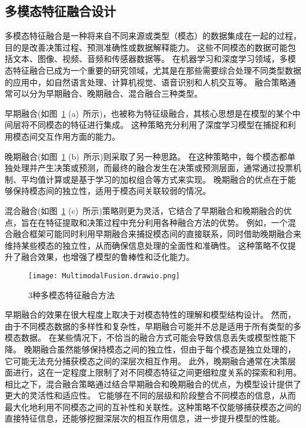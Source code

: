 \subsection{多模态特征融合设计}
多模态特征融合是一种将来自不同来源或类型（模态）的数据集成在一起的过程，目的是改善决策过程、预测准确性或数据解释能力。
这些不同模态的数据可能包括文本、图像、视频、音频和传感器数据等。
在机器学习和深度学习领域，多模态特征融合已成为一个重要的研究领域，尤其是在那些需要综合处理不同类型数据的应用中，如自然语言处理、计算机视觉、语音识别和人机交互等。
融合策略通常可以分为早期融合、晚期融合、混合融合三种类型\cite{hejunandzhangcaiqing}。\par

早期融合(如图~\ref{fig:MultimodalFusio} (a)~所示)，也被称为特征级融合，其核心思想是在模型的某个中间层将不同模态的特征进行集成。
这种策略充分利用了深度学习模型在捕捉和利用模态间交互作用方面的能力。\par

晚期融合(如图~\ref{fig:MultimodalFusio} (b)~所示)则采取了另一种思路。
在这种策略中，每个模态都单独处理并产生决策或预测，而最终的融合发生在决策或预测层面，通常通过投票机制、平均值计算或是基于学习的加权组合等方式来实现。
晚期融合的优点在于能够保持模态间的独立性，适用于模态间关联较弱的情况。\par

混合融合(如图~\ref{fig:MultimodalFusio} (c)~所示)策略则更为灵活，它结合了早期融合和晚期融合的优点，旨在在特征提取和决策过程中充分利用各种融合方法的优势。
例如，一个混合融合框架可能同时利用早期融合来捕捉模态间的直接联系，同时借助晚期融合来维持某些模态的独立性，从而确保信息处理的全面性和准确性。
这种策略不仅提升了融合效果，也增强了模型的鲁棒性和泛化能力。\par

\begin{figure}[h]
	\centering
	\texttt{[image: MultimodalFusion.drawio.png]}
	\caption{3种多模态特征融合方法}
	\label{fig:MultimodalFusio}
\end{figure}


早期融合的效果在很大程度上取决于对模态特性的理解和模型结构设计。
然而，由于不同模态数据的多样性和复杂性，早期融合可能并不总是适用于所有类型的多模态数据。
在某些情况下，不恰当的融合方式可能会导致信息丢失或模型性能下降。
晚期融合虽然能够保持模态之间的独立性，但由于每个模态是独立处理的，它可能无法充分捕获模态之间的深层次相互作用。
此外，晚期融合通常在决策层面进行，这在一定程度上限制了对不同模态特征之间更细粒度关系的探索和利用。
相比之下，混合融合策略通过结合早期融合和晚期融合的优点，为模型设计提供了更大的灵活性和适应性。
它能够在不同的层级和阶段整合不同模态的信息，从而最大化地利用不同模态之间的互补性和关联性。这种策略不仅能够捕获模态之间的直接特征信息，还能够挖掘深层次的相互作用信息，进一步提升模型的性能。\par




